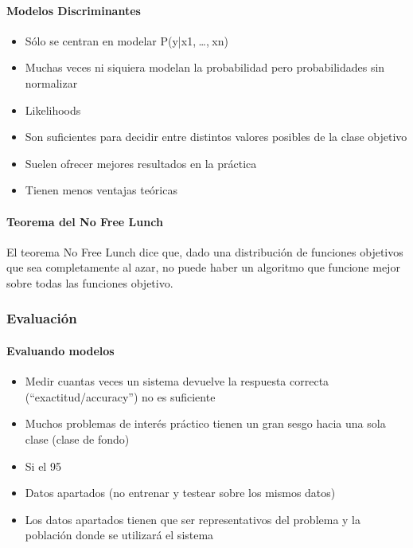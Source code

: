 \documentclass[a4paper,10pt]{article}
\begin{document}
\paragraph{Modelos Discriminantes}
\begin{itemize}
 \item Sólo se centran en modelar P(y|x1, …, xn)
\item Muchas veces ni siquiera modelan la probabilidad pero probabilidades sin normalizar
\item Likelihoods
\item Son suficientes para decidir entre distintos valores posibles de la clase objetivo
\item Suelen ofrecer mejores resultados en la práctica
\item Tienen menos ventajas teóricas
\end{itemize}



\paragraph{Teorema del No Free Lunch}
El teorema No Free Lunch dice que, dado una distribución de funciones objetivos que sea completamente al azar, no puede haber un algoritmo que funcione mejor sobre todas las funciones objetivo.

\subsubsection{Evaluación}

\paragraph {Evaluando modelos}
\begin{itemize}
 \item Medir cuantas veces un sistema devuelve la respuesta correcta (“exactitud/accuracy”) no es suficiente
\item Muchos problemas de interés práctico tienen un gran sesgo hacia una sola clase (clase de fondo)
\item Si el 95%
\item Datos apartados (no entrenar y testear sobre los mismos datos)
\item Los datos apartados tienen que ser representativos del problema y la población donde se utilizará el sistema
\end{itemize}
\end{document}
